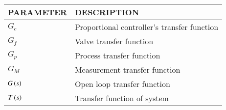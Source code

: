 \begin{tabular}{|p{2cm}|p{6cm}|}
    \hline
    PARAMETER & DESCRIPTION \\ \hline
    $G_c$ & Proportional controller's transfer function \\ \hline
    $G_f$ & Valve transfer function \\ \hline
    $G_p$ & Process transfer function   \\ \hline
    $G_M$ & Measurement transfer function \\ \hline 
    $G\left(s\right)$ & Open loop transfer function \\ \hline
    $T\left(s\right)$ & Transfer function of system \\ \hline
\end{tabular}
